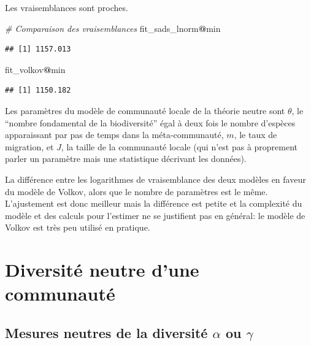 \documentclass[
  11pt,
  french,
  a4paper,
  extrafontsizes,onecolumn,openright
  ]{memoir}
\newenvironment{Shaded}{\begin{snugshade}}{\end{snugshade}}
\newcommand{\CommentTok}[1]{\textcolor[rgb]{0.56,0.35,0.01}{\textit{#1}}}
\newcommand{\NormalTok}[1]{#1}
\newcommand{\SpecialCharTok}[1]{\textcolor[rgb]{0.81,0.36,0.00}{\textbf{#1}}}
\begin{document}
\normalsize

Les vraisemblances sont proches.

\scriptsize

\begin{Shaded}
\begin{Highlighting}[]
\CommentTok{\# Comparaison des vraisemblances}
\NormalTok{fit\_sads\_lnorm}\SpecialCharTok{@}\NormalTok{min}
\end{Highlighting}
\end{Shaded}

\begin{verbatim}
## [1] 1157.013
\end{verbatim}

\begin{Shaded}
\begin{Highlighting}[]
\NormalTok{fit\_volkov}\SpecialCharTok{@}\NormalTok{min}
\end{Highlighting}
\end{Shaded}

\begin{verbatim}
## [1] 1150.182
\end{verbatim}

\normalsize

Les paramètres du modèle de communauté locale de la théorie neutre sont \(\theta\), le ``nombre fondamental de la biodiversité'' égal à deux fois le nombre d'espèces apparaissant par pas de temps dans la méta-communauté, \(m\), le taux de migration, et \(J\), la taille de la communauté locale (qui n'est pas à proprement parler un paramètre mais une statistique décrivant les données).

La différence entre les logarithmes de vraisemblance des deux modèles en faveur du modèle de Volkov, alors que le nombre de paramètres est le même.
L'ajustement est donc meilleur mais la différence est petite et la complexité du modèle et des calculs pour l'estimer ne se justifient pas en général: le modèle de Volkov est très peu utilisé en pratique.

\part{Diversité neutre d'une communauté}\label{part-diversituxe9-neutre-dune-communautuxe9}

\chapter{\texorpdfstring{Mesures neutres de la diversité \(\alpha\) ou \(\gamma\)}{Mesures neutres de la diversité \textbackslash alpha ou \textbackslash gamma}}\label{chap-MesuresNeutres}
\end{document}
